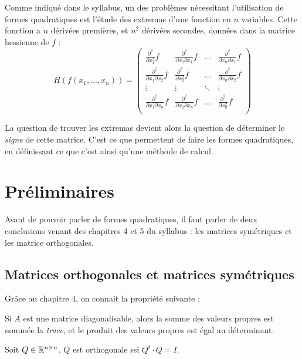 Comme indiqué dans le syllabus, un des problèmes nécessitant l'utilisation de formes quadratiques est l'étude des extremas d'une fonction en $n$ variables. Cette fonction a $n$ dérivées premières, et $n^2$ dérivées secondes, données dans la matrice hessienne de $f$ :
\[ H(f(x_1, \ldots, x_n)) = \begin{pmatrix}
\frac{\partial^2}{\partial x_1^2} f & \frac{\partial^2}{\partial x_2 \partial x_1} f & \ldots & \frac{\partial^2}{\partial x_n \partial x_1} f \\
\frac{\partial^2}{\partial x_1 \partial x_2} f & \frac{\partial^2}{\partial x_2^2} f & \ldots & \frac{\partial^2}{\partial x_n \partial x_2} f \\
\vdots & \vdots & \ddots & \vdots \\
\frac{\partial^2}{\partial x_1 \partial x_n} f & \frac{\partial^2}{\partial x_2 \partial x_n} f & \ldots & \frac{\partial^2}{\partial x_n^2} f \\
\end{pmatrix} \]

La question de trouver les extremas devient alors la question de déterminer le \emph{signe} de cette matrice. C'est ce que permettent de faire les formes quadratiques, en définissant ce que c'est ainsi qu'une méthode de calcul.

\section{Préliminaires}

Avant de pouvoir parler de formes quadratiques, il faut parler de deux conclusions venant des chapitres 4 et 5 du syllabus : les matrices symétriques et les matrice orthogonales.

\subsection{Matrices orthogonales et matrices symétriques}

Grâce au chapitre 4, on connait la propriété suivante :
\begin{propriete}
Si $A$ est une matrice diagonalisable, alors la somme des valeurs propres est nommée la \emph{trace}, et le produit des valeurs propres est égal au déterminant.
\end{propriete}

\begin{defn}
Soit $Q \in \mathbb{R}^{n \times n}$. $Q$ est orthogonale ssi $Q^t \cdot Q = I$.
\end{defn}


